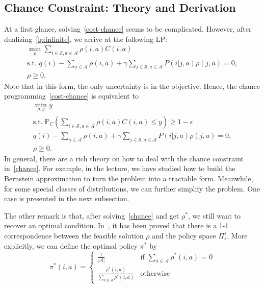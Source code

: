 \documentclass[11pt,reqno]{amsart}
\theoremstyle{definition}
\numberwithin{equation}{section}
\theoremstyle{remark}
\begin{document}
\subsection{Chance Constraint: Theory and Derivation}
At a first glance, solving~\ref{cost-chance} seems to be complicated. However, after dualizing~\ref{lp:infinite}, we arrive at the following LP:
\begin{equation}\label{lp:dual-infinite}
\begin{gathered}
    \min_{\rho}\sum_{i\in\mathcal{S},a\in\mathcal{A}}\rho(i,a)C(i,a) \\
    \text{s.t. } q(i)-\sum_{a\in\mathcal{A}}\rho(i,a)+\gamma\sum_{j\in\mathcal{S},a\in\mathcal{A}}P(i|j,a)\rho(j,a)=0,\\
    \rho\geq0.
\end{gathered}
\end{equation}
Note that in this form, the only uncertainty is in the objective. Hence, the chance programming~\ref{cost-chance} is equivalent to 
\begin{equation}\label{chance}
\begin{gathered}
    \min_{\rho,y}y\\
    \text{s.t. } \mathbb{P}_C\left(\sum_{i\in\mathcal{S},a\in\mathcal{A}}\rho(i,a)C(i,a)\leq y\right)\geq1-\epsilon\\
    q(i)-\sum_{a\in\mathcal{A}}\rho(i,a)+\gamma\sum_{j\in\mathcal{S},a\in\mathcal{A}}P(i|j,a)\rho(j,a)=0,\\
    \rho\geq0.
\end{gathered}
\end{equation}
In general, there are a rich theory on how to deal with the chance constraint in~\ref{chance}. For example, in the lecture, we have studied how to build the Bernstein approximation to turn the problem into a tractable form. Meanwhile, for some special classes of distributions, we can further simplify the problem. One case is presented in the next subsection.

\medskip

The other remark is that, after solving~\ref{chance} and get $\rho^*$, we still want to recover an optimal condition. In~\cite{puterman2014markov}, it has been proved that there is a 1-1 correspondence between the feasible solution $\rho$ and the policy space $\Pi^s_s$. More explicitly, we can define the optimal policy $\pi^*$ by
\begin{equation}\label{rho-to-policy}
\pi^*(i,a) = \begin{cases}
\frac{1}{|\mathcal{A}|} &\text{if $\sum_{a\in\mathcal{A}}\rho^*(i,a)$ = 0}\\
\frac{\rho^*(i,a)}{\sum_{a\in\mathcal{A}}\rho^*(i,a)} &\text{otherwise}
\end{cases}
\end{equation}
\end{document}
